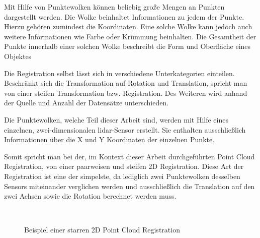 Mit Hilfe von Punktewolken können beliebig große Mengen an Punkten dargestellt werden.
Die Wolke beinhaltet Informationen zu jedem der Punkte.
Hierzu gehören zumindest die Koordinaten.
Eine solche Wolke kann jedoch auch weitere Informationen wie Farbe oder Krümmung beinhalten. 
Die Gesamtheit der Punkte innerhalb einer solchen Wolke beschreibt die Form und Oberfläche eines Objektes
\cite[ch. 2.2]{registration2021}

Die Registration selbst lässt sich in verschiedene Unterkategorien einteilen.
Beschränkt sich die Transformation auf Rotation und Translation, spricht man von einer steifen Transformation bzw. Registration.
Des Weiteren wird anhand der Quelle und Anzahl der Datensätze unterschieden.

Die Punktewolken, welche Teil dieser Arbeit sind, werden mit Hilfe eines einzelnen, zwei-dimensionalen \ac{lidar}-Sensor erstellt.
Sie enthalten ausschließlich Informationen über die X und Y Koordinaten der einzelnen Punkte.

Somit spricht man bei der, im Kontext dieser Arbeit durchgeführten Point Cloud Registration, von einer paarweisen und steifen 2D Registration.
Diese Art der Registration ist eine der simpelste, da lediglich zwei Punktewolken desselben Sensors miteinander verglichen werden 
und ausschließlich die Translation auf den zwei Achsen sowie die Rotation berechnet werden muss.

\begin{figure}[H]
    \centering
     \\
    \caption{Beispiel einer starren 2D Point Cloud Registration}
    \label{fig:registrationExample}
\end{figure}

